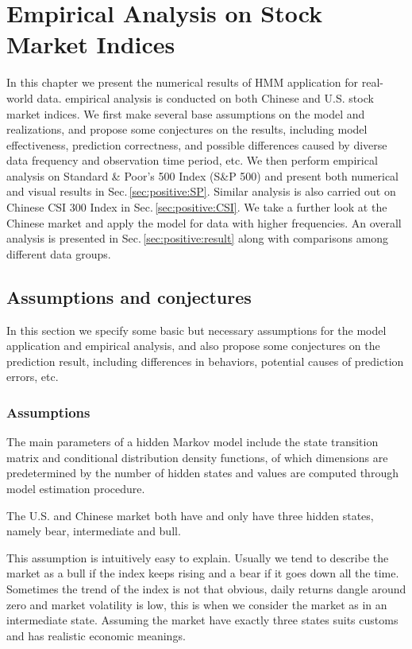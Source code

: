 
\chapter{Empirical Analysis on Stock Market Indices}
\label{chap:positive}

In this chapter we present the numerical results of HMM application for real-world data. 
empirical analysis is conducted on both Chinese and U.S. stock market indices.
We first make several base assumptions on the model and realizations, 
and propose some conjectures on the results, 
including model effectiveness, prediction correctness, 
and possible differences caused by diverse data frequency and observation time period, etc.
We then perform empirical analysis on Standard \& Poor's 500 Index (S\&P 500) and present both 
numerical and visual results in Sec.\,\ref{sec:positive:SP}.
Similar analysis is also carried out on Chinese CSI 300 Index in Sec.\,\ref{sec:positive:CSI}.
We take a further look at the Chinese market and apply the model for data with higher frequencies.
An overall analysis is presented in Sec.\,\ref{sec:positive:result} 
along with comparisons among different data groups.


\section{Assumptions and conjectures}
\label{sec:positive:aspconj}
In this section we specify some basic but necessary assumptions 
for the model application and empirical analysis,
and also propose some conjectures on the prediction result,
including differences in behaviors, potential causes of prediction errors, etc.


\subsection{Assumptions}
\label{sec:positive:aspconj:asp}
The main parameters of a hidden Markov model include 
the state transition matrix and conditional distribution density functions, 
of which dimensions are predetermined by the number of hidden states 
and values are computed through model estimation procedure.

        \begin{asp}
        \label{asp:states}
        The U.S. and Chinese market both have and only have three hidden states,
        namely bear, intermediate and bull.
        \end{asp}
This assumption is intuitively easy to explain.
Usually we tend to describe the market as a bull if the index keeps rising 
and a bear if it goes down all the time.
Sometimes the trend of the index is not that obvious,
daily returns dangle around zero and market volatility is low,
this is when we consider the market as in an intermediate state.
Assuming the market have exactly three states suits customs and has realistic economic meanings.


